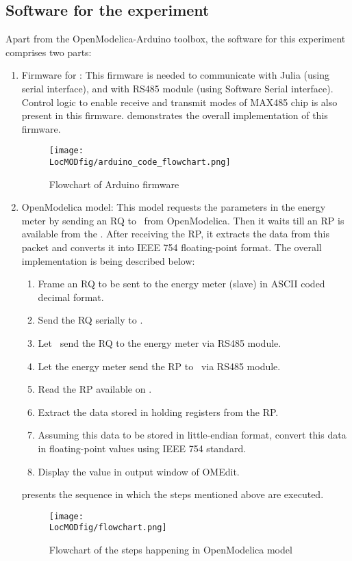 \subsection{Software for the experiment}
Apart from the OpenModelica-Arduino toolbox, the software for this experiment comprises two parts:
\begin{enumerate}
\item  Firmware for \arduino: This firmware is needed to communicate
with Julia (using serial interface), and with RS485 module (using
Software Serial interface). Control logic to enable receive and
transmit modes of MAX485 chip is also present in this firmware.  demonstrates the overall implementation of this firmware.

\begin{figure}
    \centering
    \texttt{[image: \\LocMODfig/arduino\_code\_flowchart.png]}
    \caption{Flowchart of Arduino firmware}
    \label{fig:modbus-firmware}
\end{figure}

\item OpenModelica model: This model requests the parameters in the energy meter
by sending an RQ to \arduino\ from OpenModelica. Then it waits till
an RP is available from the \arduino. After receiving the RP, it extracts
the data from this packet and converts it into IEEE
754 floating-point format. The overall implementation is being
described below:
\begin {enumerate}
\item Frame an RQ to be sent to the energy meter (slave) in ASCII coded decimal
format.
\item Send the RQ serially to \arduino.
\item Let \arduino\ send the RQ to the energy meter via RS485 module.
\item Let the energy meter send the RP to \arduino\ via RS485 module.
\item Read the RP available on \arduino.
\item Extract the data stored in holding registers from the RP.
\item Assuming this data to be stored in little-endian format,
convert this data in floating-point values using IEEE 754 standard.
\item Display the value in output window of OMEdit.
\end{enumerate}
 presents the sequence in which the steps mentioned above are executed.
\begin{figure}
    \centering
    \texttt{[image: \\LocMODfig/flowchart.png]}
    \caption{Flowchart of the steps happening in OpenModelica model}
    \label{fig:flow-chart}
\end{figure}
\end{enumerate}


